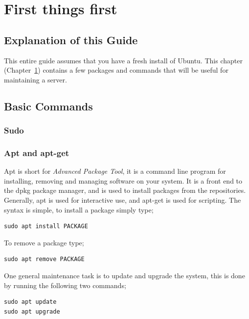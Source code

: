 \chapter{First things first}
\label{chp:first}

\section{Explanation of this Guide}

This entire guide assumes that you have a fresh install of Ubuntu. This chapter (Chapter~\ref{chp:first}) contains a few packages and commands that will be useful for maintaining a server.~

\section{Basic Commands}

\subsection{Sudo}
\label{ssec:sudo}


\subsection{Apt and apt-get} 
\label{ssec:apt}

Apt is short for \textit{Advanced Package Tool}, it is a command line program for installing, removing and managing software on your system.  It is a front end to the dpkg package manager, and is used to install packages from the repositories. Generally, apt is used for interactive use, and apt-get is used for scripting.  The syntax is simple, to install a package simply type;

\begin{lstlisting}
sudo apt install PACKAGE
\end{lstlisting}

To remove a package type;

\begin{lstlisting}
sudo apt remove PACKAGE
\end{lstlisting}

One general maintenance task is to update and upgrade the system, this is done by running the following two commands;

\begin{lstlisting}
sudo apt update
sudo apt upgrade
\end{lstlisting}

